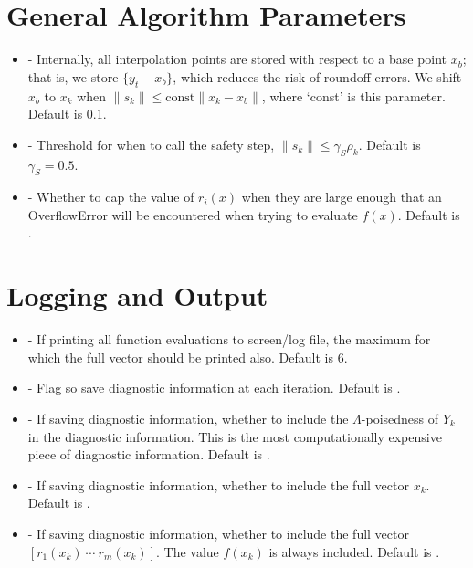\documentclass[letterpaper,10pt,english]{sphinxmanual}
\begin{document}
\section{General Algorithm Parameters}
\label{\detokenize{advanced:general-algorithm-parameters}}\begin{itemize}
\item {} 
 - Internally, all interpolation points are stored with respect to a base point \(x_b\); that is, we store \(\{y_t-x_b\}\), which reduces the risk of roundoff errors. We shift \(x_b\) to \(x_k\) when \(\|s_k\| \leq \text{const}\|x_k-x_b\|\), where ‘const’ is this parameter. Default is 0.1.

\item {} 
 - Threshold for when to call the safety step, \(\|s_k\| \leq \gamma_S \rho_k\). Default is \(\gamma_S =0.5\).

\item {} 
 - Whether to cap the value of \(r_i(x)\) when they are large enough that an OverflowError will be encountered when trying to evaluate \(f(x)\). Default is .

\end{itemize}


\section{Logging and Output}
\label{\detokenize{advanced:logging-and-output}}\begin{itemize}
\item {} 
 - If printing all function evaluations to screen/log file, the maximum  for which the full vector  should be printed also. Default is 6.

\item {} 
 - Flag so save diagnostic information at each iteration. Default is .

\item {} 
 - If saving diagnostic information, whether to include the \(\Lambda\)-poisedness of \(Y_k\) in the diagnostic information. This is the most computationally expensive piece of diagnostic information. Default is .

\item {} 
 - If saving diagnostic information, whether to include the full vector \(x_k\). Default is .

\item {} 
 - If saving diagnostic information, whether to include the full vector \([r_1(x_k)\:\cdots\:r_m(x_k)]\). The value \(f(x_k)\) is always included. Default is .

\end{itemize}
\end{document}
